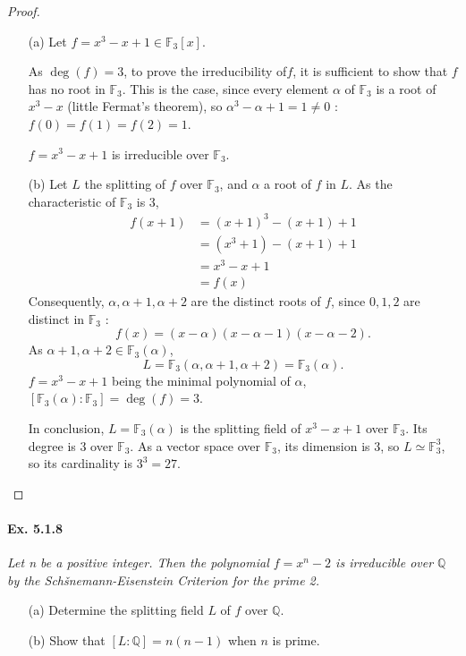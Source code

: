 \documentclass[11pt,a4paper]{article}
\newcommand{\Q}{\mathbb{Q}}
\newcommand{\F}{\mathbb{F}}
\begin{document}
\begin{proof}
\begin{enumerate}
\item[(a)]
Let $f = x^3-x+1 \in \F_3[x]$.

As $\deg(f) = 3$, to prove the irreducibility of$f$, it is sufficient to show that $f$ has no root in $\F_3$.
This is the case, since every element $\alpha$ of $\F_3$ is a root of $x^3-x$ (little Fermat's theorem), so $\alpha^3 - \alpha + 1 = 1 \ne 0$ : $f(0) = f(1)=f(2) = 1$.

$f = x^3-x+1$ is irreducible over $\F_3$.

\item[(b)]
Let $L$ the splitting  of $f$ over $\F_3$, and $\alpha$ a root of $f$ in $L$.
As the characteristic of $\F_3$ is 3,
\begin{align*}
f(x+1) &= (x+1)^3 -(x+1)+1\\
&= (x^3+1)-(x+1)+1\\
&= x^3-x+1\\
&=f(x)
\end{align*}
Consequently, $\alpha, \alpha+1,\alpha+2$ are the distinct roots of $f$, since $0,1,2$ are distinct in $\F_3$ : 
$$f(x) = (x-\alpha)(x-\alpha-1)(x-\alpha-2).$$
As $\alpha+1,\alpha+2 \in \F_3(\alpha)$, 
$$L = \F_3(\alpha,\alpha+1,\alpha+2) = \F_3(\alpha).$$
$f=x^3-x+1$ being the minimal polynomial of $\alpha$, $[\F_3(\alpha) : \F_3] = \deg(f) = 3$.

In conclusion, $L = \F_3(\alpha)$ is the splitting field of $x^3-x+1$ over $\F_3$. Its degree is 3 over $\F_3$. As a vector space over $\F_3$, its dimension is 3, so  $L \simeq \F_3^3$, so its cardinality is $3^3=27$.
\end{enumerate}
\end{proof}

\paragraph{Ex. 5.1.8}

{\it Let n be a positive integer. Then the polynomial $f = x^n-2$ is irreducible over $\Q$ by the Schšnemann-Eisenstein Criterion for the prime 2.
\begin{enumerate}
\item[(a)] Determine the splitting field $L$ of $f$ over $\Q$.
\item[(b)] Show that $[L:\Q] = n(n-1)$ when $n$ is prime.
\end{enumerate}
}
\end{document}
